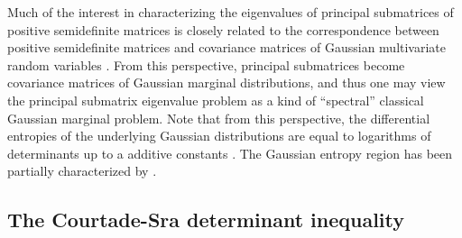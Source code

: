 \documentclass[notitlepage, 10pt]{article}
\begin{document}
{\color{blue}
\begin{rem}
    Much of the interest in characterizing the eigenvalues of principal submatrices of positive semidefinite matrices is closely related to the correspondence between positive semidefinite matrices and covariance matrices of Gaussian multivariate random variables \cite{lami2017log}.
    From this perspective, principal submatrices become covariance matrices of Gaussian marginal distributions, and thus one may view the principal submatrix eigenvalue problem as a kind of ``spectral'' classical Gaussian marginal problem.
    Note that from this perspective, the differential entropies of the underlying Gaussian distributions are equal to logarithms of determinants up to a additive constants \cite{lami2017log}.
    The Gaussian entropy region has been partially characterized by \citeauthor{shadbakht2011entropy} \cite{shadbakht2011entropy,hassibi2008entropy}.
\end{rem}
}

\subsection{The Courtade-Sra determinant inequality}
\end{document}
